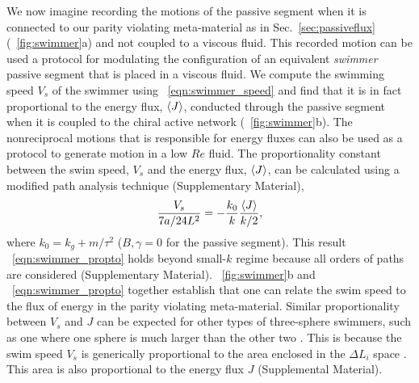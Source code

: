 \documentclass[
 preprint,
 preprintnumbers,
 amsmath,amssymb,
 aps,
 pre,
 longbibliography,
 superscriptaddress,
 10pt, twocolumn
]{revtex4-1}
\begin{document}
We now imagine recording the motions of the passive segment when it is connected to our parity violating meta-material as in Sec.~\ref{sec:passiveflux}(\figurename~\ref{fig:swimmer}a) and not coupled to a viscous fluid. This recorded motion can be used a protocol for modulating the configuration of an equivalent {\it swimmer} passive segment that is placed in a viscous fluid.
We compute the swimming speed $V_s$ of the swimmer using \eqnname~\ref{eqn:swimmer_speed} and find that it is in fact proportional to the energy flux, $\expval{J}$, conducted through the passive segment when it is coupled to the chiral active network (\figurename~\ref{fig:swimmer}b). The nonreciprocal motions that is responsible for energy fluxes can also be used as a protocol to generate motion in a low $Re$ fluid.
The proportionality constant between the swim speed, $V_s$ and the energy flux, $\expval{J}$, can be calculated using a modified path analysis technique (Supplementary Material),
\begin{equation} \label{eqn:swimmer_propto}
    \frac{V_s}{7a/24L^2} = -\frac{k_0}{k} \frac{\expval{J}}{k/2},
\end{equation}
where $k_0 = k_g + m/\tau^2$ ($B,\gamma=0$ for the passive segment).
This result \eqnname~\eqref{eqn:swimmer_propto} holds beyond small-$k$ regime because all orders of paths are considered (Supplementary Material).
\figurename~\ref{fig:swimmer}b and \eqnname~\eqref{eqn:swimmer_propto} together establish that one can relate the swim speed to the flux of energy in the parity violating meta-material. 
Similar proportionality between $V_s$ and $J$ can be expected for other types of three-sphere swimmers, such as one where one sphere is much larger than the other two \cite{Golestanian2008ThreesphereLowReynoldsnumber}. This is because the swim speed $V_s$ is generically proportional to the area enclosed in the $\Delta L_i$ space \cite{Golestanian2009StochasticLow}. This area is also proportional to the energy flux $J$ (Supplemental Material).

\end{document}
